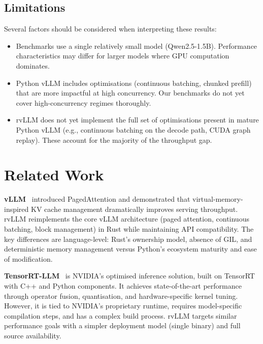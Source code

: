 \documentclass[11pt,a4paper]{article}
\begin{document}
\subsection{Limitations}

Several factors should be considered when interpreting these results:
\begin{itemize}
  \item Benchmarks use a single relatively small model (Qwen2.5-1.5B). Performance
        characteristics may differ for larger models where GPU computation dominates.
  \item Python vLLM includes optimisations (continuous batching, chunked prefill)
        that are more impactful at high concurrency. Our benchmarks do not yet cover
        high-concurrency regimes thoroughly.
  \item rvLLM does not yet implement the full set of optimisations present in mature
        Python vLLM (e.g., continuous batching on the decode path, CUDA graph replay).
        These account for the majority of the throughput gap.
\end{itemize}

\section{Related Work}
\label{sec:related}

\textbf{vLLM}~\cite{kwon2023vllm} introduced PagedAttention and demonstrated that
virtual-memory-inspired KV cache management dramatically improves serving throughput.
rvLLM reimplements the core vLLM architecture (paged attention, continuous batching,
block management) in Rust while maintaining API compatibility. The key differences are
language-level: Rust's ownership model, absence of GIL, and deterministic memory
management versus Python's ecosystem maturity and ease of modification.

\textbf{TensorRT-LLM}~\cite{tensorrtllm2024} is NVIDIA's optimised inference solution,
built on TensorRT with C++ and Python components. It achieves state-of-the-art
performance through operator fusion, quantisation, and hardware-specific kernel tuning.
However, it is tied to NVIDIA's proprietary runtime, requires model-specific compilation
steps, and has a complex build process. rvLLM targets similar performance goals with a
simpler deployment model (single binary) and full source availability.
\end{document}
